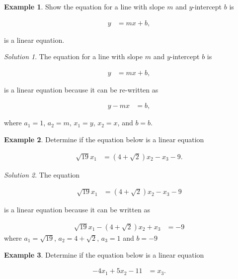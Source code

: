 \documentclass[
]{book}
\theoremstyle{definition}
\theoremstyle{definition}
\newtheorem{example}{Example}[chapter]
\theoremstyle{definition}
\theoremstyle{definition}
\theoremstyle{remark}
\newtheorem*{solution}{Solution}
\begin{document}
\begin{example}
Show the equation for a line with slope \(m\) and \(y\)-intercept \(b\) is

\[
\begin{aligned}
y & = m x + b,
\end{aligned}
\]

is a linear equation.
\end{example}

\begin{solution}
The equation for a line with slope \(m\) and \(y\)-intercept \(b\) is

\[
\begin{aligned}
y & = m x + b,
\end{aligned}
\]

is a linear equation because it can be re-written as

\[
\begin{aligned}
y - m x & = b,
\end{aligned}
\]

where \(a_1 = 1\), \(a_2 = m\), \(x_1 = y\), \(x_2 = x\), and \(b=b\).
\end{solution}

\begin{example}
Determine if the equation below is a linear equation

\[
\begin{aligned}
\sqrt{19} x_1 & = (4 + \sqrt{2}) x_2 - x_3 - 9.
\end{aligned}
\]
\end{example}

\begin{solution}
The equation

\[
\begin{aligned}
\sqrt{19} x_1 & = (4 + \sqrt{2}) x_2 - x_3 - 9
\end{aligned}
\]

is a linear equation because it can be written as

\[
\begin{aligned}
\sqrt{19} x_1 - (4 + \sqrt{2}) x_2 + x_3 & = - 9
\end{aligned}
\]
where \(a_1 = \sqrt{19}\), \(a_2 = 4 + \sqrt{2}\), \(a_3 = 1\) and \(b = -9\)
\end{solution}

\begin{example}
Determine if the equation below is a linear equation

\[
\begin{aligned}
-4 x_1 + 5 x_2 - 11 & = x_3.
\end{aligned}
\]
\end{example}
\end{document}
